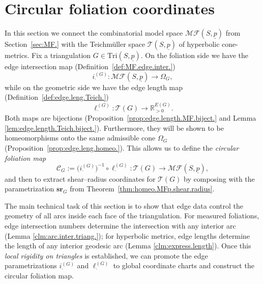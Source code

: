 \documentclass[11pt, letterpaper]{amsart}
\theoremstyle{definition}
\theoremstyle{remark}
\newcommand{\up}{\underline{p}}
\newcommand{\Sp}{(S,\up)}
\newcommand{\TSp}{\text{Tri}\Sp}
\newcommand{\lG}{\ell^{(G)}}
\newcommand{\iG}{i^{(G)}}
\newcommand{\cMFp}{\mathcal{MF} (S,\up)}
\newcommand{\cC}{\mathcal{C}}
\newcommand{\cT}{\mathcal{T}}
\newcommand{\cTp}{\mathcal{T} (S,\up)}
\newcommand{\bR}{\mathbb{R}}
\numberwithin{equation}{section}
\begin{document}
 \section{Circular foliation coordinates}
\label{sec:circ.foli.coor.app.}

In this section we connect the combinatorial model space $\cMFp$ from
Section~\ref{sec:MF.} with the Teichm\"uller space $\cTp$ of hyperbolic
cone-metrics.  Fix a triangulation $G\in\TSp$.  On the foliation side we
have the edge intersection map (Definition~\ref{def:MF.edge.inter.})
\[
\iG_{\cdot} : \cMFp \longrightarrow \Omega_G,
\]
while on the geometric
side we have the edge length map (Definition~\ref{def:edge.leng.Teich.})
\[
\lG_{\cdot} : \cT(G) \longrightarrow \bR_{>0}^{E(G)}.
\] 
Both maps are bijections (Proposition~\ref{prop:edge.length.MF.biject.} and Lemma \ref{lem:edge.length.Teich.biject.}). Furthermore, they will be shown to be homeomorphisms onto the same admissible cone $\Omega_G$
(Proposition~\ref{prop:edge.leng.homeo.}).  This allows us to define the
\emph{circular foliation map}
\[
\cC_G
:= \big(\iG_{\cdot}\big)^{-1}\circ \lG_{\cdot}
: \cT(G) \longrightarrow \cMFp,
\]
and then to extract shear--radius coordinates for $\cT(G)$ by composing
with the parametrization $\mathbf{sr}_G$ from
Theorem~\ref{thm:homeo.MFp.shear.radius}.

The main technical task of this section is to show that edge data control the geometry of all arcs inside each face of the triangulation.  For measured
foliations, edge intersection numbers determine the
intersection with any interior arc (Lemma \ref{clm:arc.inter.triang.}); for hyperbolic metrics, edge lengths determine the length of any interior geodesic arc (Lemma \ref{clm:express.length}).  Once this
\emph{local rigidity on triangles} is established, we can promote the edge
parametrizations $\iG_{\cdot}$ and $\lG_{\cdot}$ to global coordinate
charts and construct the circular foliation map.
\end{document}
